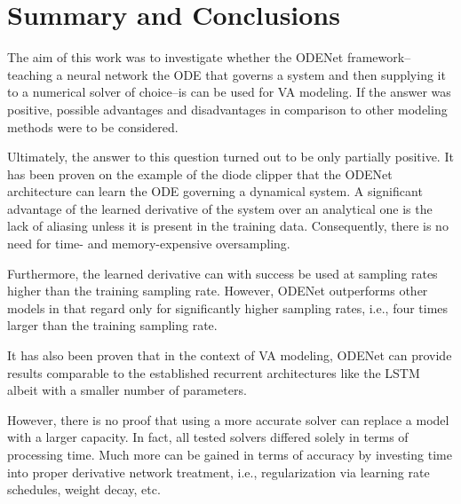 \chapter{Summary and Conclusions}
\label{chapter:conclusions}


The aim of this work was to investigate whether the ODENet framework--teaching a neural network the \ac{ODE} that governs a system and then supplying it to a numerical solver of choice--is can be used for \ac{VA} modeling. If the answer was positive, possible advantages and disadvantages in comparison to other modeling methods were to be considered.

Ultimately, the answer to this question turned out to be only partially positive. It has been proven on the example of the diode clipper that the ODENet architecture can learn the \ac{ODE} governing a dynamical system. A significant advantage of the learned derivative of the system over an analytical one is the lack of aliasing unless it is present in the training data. Consequently, there is no need for time- and memory-expensive oversampling.

Furthermore, the learned derivative can with success be used at sampling rates higher than the training sampling rate. However, ODENet outperforms other models in that regard only for significantly higher sampling rates, i.e., four times larger than the training sampling rate.

It has also been proven that in the context of \ac{VA} modeling, ODENet can provide results comparable to the established recurrent architectures like the \ac{LSTM} albeit with a smaller number of parameters.

However, there is no proof that using a more accurate solver can replace a model with a larger capacity. In fact, all tested solvers differed solely in terms of processing time. Much more can be gained in terms of accuracy by investing time into proper derivative network treatment, i.e., regularization via learning rate schedules, weight decay, etc.


